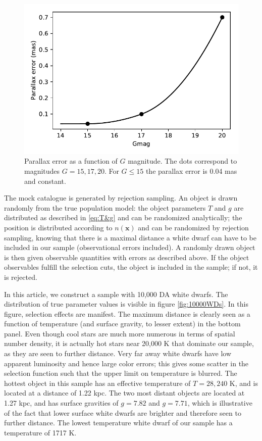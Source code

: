 \documentclass[fleqn,usenatbib]{mnras}
\newcommand{\Teff}{T}
\newcommand{\logg}{g}
\begin{document}
\begin{figure}
	\includegraphics[width=\columnwidth]{parallax_error.pdf}
    \caption{Parallax error as a function of $G$ magnitude. The dots correspond to magnitudes $G=15,17,20$. For $G\leq 15$ the parallax error is 0.04 mas and constant.}
    \label{fig:parallax_error}
\end{figure}

The mock catalogue is generated by rejection sampling. An object is drawn randomly from the true population model: the object parameters $\Teff$ and $\logg$ are distributed as described in \eqref{eq:T&g} and can be randomized analytically; the position is distributed according to $n(\mathbf{x})$ and can be randomized by rejection sampling, knowing that there is a maximal distance a white dwarf can have to be included in our sample (observational errors included). A randomly drawn object is then given observable quantities with errors as described above. If the object observables fulfill the selection cuts, the object is included in the sample; if not, it is rejected.

In this article, we construct a sample with 10,000 DA white dwarfs. The distribution of true parameter values is visible in figure \ref{fig:10000WDs}. In this figure, selection effects are manifest. The maximum distance is clearly seen as a function of temperature (and surface gravity, to lesser extent) in the bottom panel. Even though cool stars are much more numerous in terms of spatial number density, it is actually hot stars near 20,000 K that dominate our sample, as they are seen to further distance. Very far away white dwarfs have low apparent luminosity and hence large color errors; this gives some scatter in the selection function such that the upper limit on temperature is blurred. The hottest object in this sample has an effective temperature of $\Teff=28,240$ K, and is located at a distance of 1.22 kpc. The two most distant objects are located at 1.27 kpc, and has surface gravities of $\logg=7.82$ and $\logg=7.71$, which is illustrative of the fact that lower surface white dwarfs are brighter and therefore seen to further distance. The lowest temperature white dwarf of our sample has a temperature of 1717 K.
\end{document}
